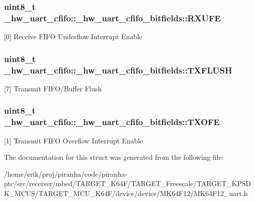 \subsubsection[{\texorpdfstring{R\+X\+U\+FE}{RXUFE}}]{\setlength{\rightskip}{0pt plus 5cm}uint8\+\_\+t \+\_\+hw\+\_\+uart\+\_\+cfifo\+::\+\_\+hw\+\_\+uart\+\_\+cfifo\+\_\+bitfields\+::\+R\+X\+U\+FE}\hypertarget{struct__hw__uart__cfifo_1_1__hw__uart__cfifo__bitfields_a6ab2f75a13d9e7297030f9c95c2aa338}{}\label{struct__hw__uart__cfifo_1_1__hw__uart__cfifo__bitfields_a6ab2f75a13d9e7297030f9c95c2aa338}
\mbox{[}0\mbox{]} Receive F\+I\+FO Underflow Interrupt Enable 
\subsubsection[{\texorpdfstring{T\+X\+F\+L\+U\+SH}{TXFLUSH}}]{\setlength{\rightskip}{0pt plus 5cm}uint8\+\_\+t \+\_\+hw\+\_\+uart\+\_\+cfifo\+::\+\_\+hw\+\_\+uart\+\_\+cfifo\+\_\+bitfields\+::\+T\+X\+F\+L\+U\+SH}\hypertarget{struct__hw__uart__cfifo_1_1__hw__uart__cfifo__bitfields_a9e0a36b78566a7d178bd58e6c256df4d}{}\label{struct__hw__uart__cfifo_1_1__hw__uart__cfifo__bitfields_a9e0a36b78566a7d178bd58e6c256df4d}
\mbox{[}7\mbox{]} Transmit F\+I\+F\+O/\+Buffer Flush 
\subsubsection[{\texorpdfstring{T\+X\+O\+FE}{TXOFE}}]{\setlength{\rightskip}{0pt plus 5cm}uint8\+\_\+t \+\_\+hw\+\_\+uart\+\_\+cfifo\+::\+\_\+hw\+\_\+uart\+\_\+cfifo\+\_\+bitfields\+::\+T\+X\+O\+FE}\hypertarget{struct__hw__uart__cfifo_1_1__hw__uart__cfifo__bitfields_a4a3a9941bc784044b5a6f4fbac8915de}{}\label{struct__hw__uart__cfifo_1_1__hw__uart__cfifo__bitfields_a4a3a9941bc784044b5a6f4fbac8915de}
\mbox{[}1\mbox{]} Transmit F\+I\+FO Overflow Interrupt Enable 

The documentation for this struct was generated from the following file\+:\begin{DoxyCompactItemize}
\item 
/home/erik/proj/piranha/code/piranha-\/ptc/src/receiver/mbed/\+T\+A\+R\+G\+E\+T\+\_\+\+K64\+F/\+T\+A\+R\+G\+E\+T\+\_\+\+Freescale/\+T\+A\+R\+G\+E\+T\+\_\+\+K\+P\+S\+D\+K\+\_\+\+M\+C\+U\+S/\+T\+A\+R\+G\+E\+T\+\_\+\+M\+C\+U\+\_\+\+K64\+F/device/device/\+M\+K64\+F12/M\+K64\+F12\+\_\+uart.\+h\end{DoxyCompactItemize}
